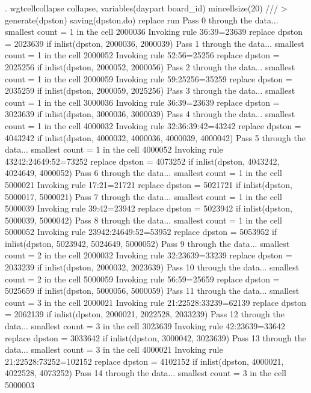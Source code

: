 . wgtcellcollapse collapse, variables(daypart board_id) mincellsize(20) ///
>         generate(dpston) saving(dpston.do) replace run
Pass 0 through the data...
  smallest count = 1 in the cell      2000036
  Invoking rule 36:39=23639
  replace dpston = 2023639 if inlist(dpston, 2000036, 2000039)
Pass 1 through the data...
  smallest count = 1 in the cell      2000052
  Invoking rule 52:56=25256
  replace dpston = 2025256 if inlist(dpston, 2000052, 2000056)
Pass 2 through the data...
  smallest count = 1 in the cell      2000059
  Invoking rule 59:25256=35259
  replace dpston = 2035259 if inlist(dpston, 2000059, 2025256)
Pass 3 through the data...
  smallest count = 1 in the cell      3000036
  Invoking rule 36:39=23639
  replace dpston = 3023639 if inlist(dpston, 3000036, 3000039)
Pass 4 through the data...
  smallest count = 1 in the cell      4000032
  Invoking rule 32:36:39:42=43242
  replace dpston = 4043242 if inlist(dpston, 4000032, 4000036, 4000039, 4000042)
Pass 5 through the data...
  smallest count = 1 in the cell      4000052
  Invoking rule 43242:24649:52=73252
  replace dpston = 4073252 if inlist(dpston, 4043242, 4024649, 4000052)
Pass 6 through the data...
  smallest count = 1 in the cell      5000021
  Invoking rule 17:21=21721
  replace dpston = 5021721 if inlist(dpston, 5000017, 5000021)
Pass 7 through the data...
  smallest count = 1 in the cell      5000039
  Invoking rule 39:42=23942
  replace dpston = 5023942 if inlist(dpston, 5000039, 5000042)
Pass 8 through the data...
  smallest count = 1 in the cell      5000052
  Invoking rule 23942:24649:52=53952
  replace dpston = 5053952 if inlist(dpston, 5023942, 5024649, 5000052)
Pass 9 through the data...
  smallest count = 2 in the cell      2000032
  Invoking rule 32:23639=33239
  replace dpston = 2033239 if inlist(dpston, 2000032, 2023639)
Pass 10 through the data...
  smallest count = 2 in the cell      5000059
  Invoking rule 56:59=25659
  replace dpston = 5025659 if inlist(dpston, 5000056, 5000059)
Pass 11 through the data...
  smallest count = 3 in the cell      2000021
  Invoking rule 21:22528:33239=62139
  replace dpston = 2062139 if inlist(dpston, 2000021, 2022528, 2033239)
Pass 12 through the data...
  smallest count = 3 in the cell      3023639
  Invoking rule 42:23639=33642
  replace dpston = 3033642 if inlist(dpston, 3000042, 3023639)
Pass 13 through the data...
  smallest count = 3 in the cell      4000021
  Invoking rule 21:22528:73252=102152
  replace dpston = 4102152 if inlist(dpston, 4000021, 4022528, 4073252)
Pass 14 through the data...
  smallest count = 3 in the cell      5000003

